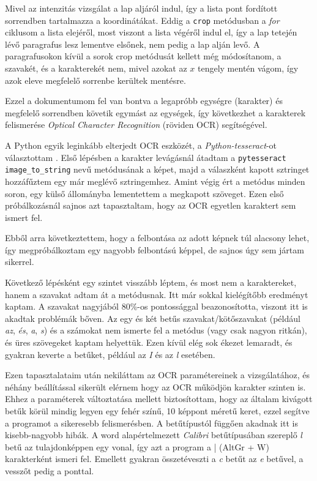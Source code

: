 Mivel az intenzitás vizsgálat a lap aljáról indul, így a lista pont fordított sorrendben tartalmazza a koordinátákat. Eddig a \texttt{crop} metódusban a \textit{for} ciklusom a lista elejéről, most viszont a lista végéről indul el, így a lap tetején lévő paragrafus lesz lementve elsőnek, nem pedig a lap alján levő. A paragrafusokon kívül a sorok crop metódusát kellett még módosítanom, a szavakét, és a karakterekét nem, mivel azokat az $x$ tengely mentén vágom, így azok eleve megfelelő sorrenbe kerültek mentésre.

Ezzel a dokumentumom fel van bontva a legapróbb egységre (karakter) és megfelelő sorrendben követik egymást az egységek, így következhet a karakterek felismerése \textit{Optical Character Recognition} (röviden OCR) segítségével.


A Python egyik leginkább elterjedt OCR eszközét, a \textit{Python-tesseract}-ot választottam \cite{tesseract}.
Első lépésben a karakter levágásnál átadtam a \texttt{pytesseract} \texttt{image\_to\_string} nevű metódusának a képet, majd a válaszként kapott sztringet hozzáfűztem egy már meglévő sztringemhez. Amint végig ért a metódus minden soron, egy külső állományba lementettem a megkapott szöveget. Ezen első próbálkozásnál sajnos azt tapasztaltam, hogy az OCR egyetlen karaktert sem ismert fel.

Ebből arra következtettem, hogy a felbontása az adott képnek túl alacsony lehet, így megpróbálkoztam egy nagyobb felbontású képpel, de sajnos úgy sem jártam sikerrel.

Következő lépésként egy szintet visszább léptem, és most nem a karaktereket, hanem a szavakat adtam át a metódusnak. Itt már sokkal kielégítőbb eredményt kaptam. A szavakat nagyjából 80\%-os pontossággal beazonosította, viszont itt is akadtak problémák bőven. Az egy és két betűs szavakat/kötőszavakat (például \emph{az}, \emph{és}, \emph{a}, \emph{s}) és a számokat nem ismerte fel a metódus (vagy csak nagyon ritkán), és üres szövegeket kaptam helyettük. Ezen kívül elég sok ékezet lemaradt, és gyakran keverte a betűket, például az \emph{I} és az \emph{l} esetében.

Ezen tapasztalataim után nekiláttam az OCR paramétereinek a vizsgálatához, és néhány beállítással sikerült elérnem hogy az OCR működjön karakter szinten is. Ehhez a paraméterek változtatása mellett biztosítottam, hogy az általam kivágott betűk körül mindig legyen egy fehér színű, 10 képpont méretű keret, ezzel segítve a programot a sikeresebb felismerésben. A betűtípustól függően akadnak itt is kisebb-nagyobb hibák. A word alapértelmezett \textit{Calibri} betűtípusában szereplő \emph{l} betű az tulajdonképpen egy vonal, így azt a program a | (AltGr + W) karakterként ismeri fel. Emellett gyakran összetéveszti a \emph{c} betűt az \emph{e} betűvel, a vesszőt pedig a ponttal.

